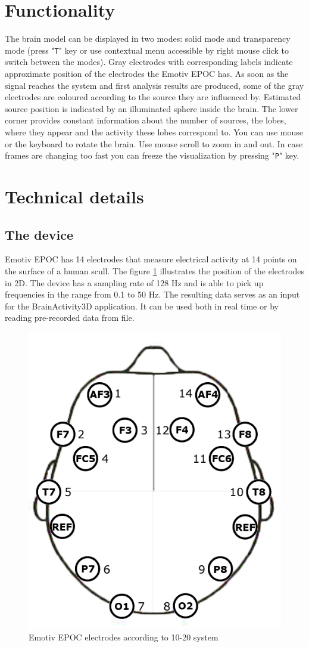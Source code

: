 \documentclass[twocolumn]{article}
\begin{document}
\thispagestyle{empty}
\clearpage

%
%
\section*{Functionality}
The brain model can be displayed in two modes: solid mode and transparency mode (press "\texttt{T}" key or use contextual menu accessible by right mouse click to switch between the modes). Gray electrodes with corresponding labels indicate approximate position of the electrodes the Emotiv EPOC has. As soon as the signal reaches the system and first analysis results are produced, some of the gray electrodes are coloured according to the source they are influenced by. Estimated source position is indicated by an illuminated sphere inside the brain. The lower corner provides constant information about the number of sources, the lobes, where they appear and the activity these lobes correspond to. You can use mouse or the keyboard to rotate the brain. Use mouse scroll to zoom in and out. In case frames are changing too fast you can freeze the visualization by pressing "\texttt{P}" key.

%
%
\section*{Technical details}

\subsection*{The device}

Emotiv EPOC has 14 electrodes that measure electrical activity at 14 points on the surface of a human scull. The figure \ref{fig:epoc_placement} illustrates the position of the electrodes in 2D. The device has a sampling rate of 128 Hz and is able to pick up frequencies in the range from 0.1 to 50 Hz. The resulting data serves as an input for the BrainActivity3D application. It can be used both in real time or by reading pre-recorded data from file.
\begin{figure}[!h]
\begin{center}
\includegraphics[width=0.5\columnwidth]{../Images/epoc_placement} 
\caption{Emotiv EPOC electrodes according to 10-20 system}
\label{fig:epoc_placement}
\end{center}
\end{figure}
\end{document}
